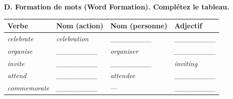 \documentclass[11pt]{article}
\newcommand{\eng}[1]{\ifmmode\text{\textit{#1}}\else\begingroup\selectlanguage{english}\itshape #1\endgroup\fi}
\begin{document}
\begin{exercice}
\textbf{D. Formation de mots (Word Formation). Complétez le tableau.}
\begin{center}
\begin{tabular}{|l|l|l|l|}
\hline
\rowcolor{popblueL} \textbf{Verbe} & \textbf{Nom (action)} & \textbf{Nom (personne)} & \textbf{Adjectif} \\
\hline
\eng{celebrate} & \eng{celebration} & \eng{\_\_\_\_\_\_\_\_} & \eng{\_\_\_\_\_\_\_\_} \\
\hline
\eng{organise} & \eng{\_\_\_\_\_\_\_\_} & \eng{organiser} & \eng{\_\_\_\_\_\_\_\_} \\
\hline
\eng{invite} & \eng{\_\_\_\_\_\_\_\_} & \eng{\_\_\_\_\_\_\_\_} & \eng{inviting} \\
\hline
\eng{attend} & \eng{\_\_\_\_\_\_\_\_} & \eng{attendee} & \eng{\_\_\_\_\_\_\_\_} \\
\hline
\eng{commemorate} & \eng{\_\_\_\_\_\_\_\_} & — & \eng{\_\_\_\_\_\_\_\_} \\
\hline
\end{tabular}
\end{center}
\end{exercice}
\end{document}
